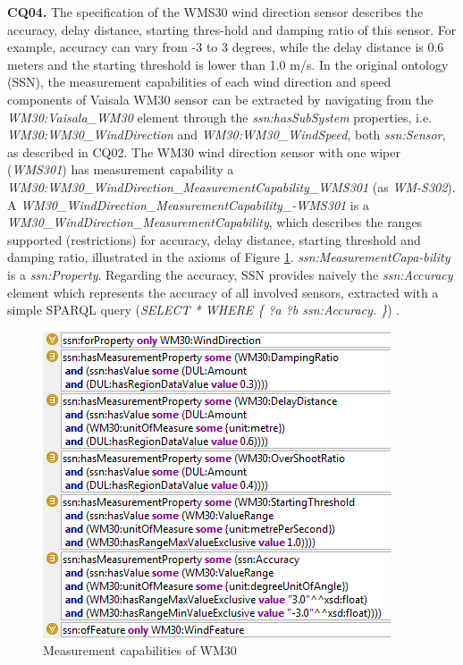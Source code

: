 \documentclass{sig-alternate-05-2015}
\begin{document}
\noindent
\textbf{CQ04.} The specification of the WMS30 wind direction sensor describes the accuracy, delay distance, starting thres-hold and damping ratio of this sensor. For example, accuracy can vary from -3 to 3 degrees, while the delay distance is 0.6 meters and the starting threshold is lower than 1.0 m/s.  
In the original ontology (SSN), the measurement capabilities of each wind direction and speed components  of Vaisala WM30 sensor can be extracted by navigating from the \textit{WM30:\-Vaisala\-\_WM30} element through the \textit{ssn:\-hasSubSystem} properties, i.e. \textit{WM30:\-WM30\-\_Wind\-Direction} and \textit{WM30:\-WM30\-\_WindSpeed}, both \textit{ssn:\-Sensor}, as described in CQ02. The WM30 wind direction sensor with one wiper (\textit{WMS301}) has measurement capability a  \textit{WM30:\-WM30\-\_Wind\-Direction\-\_MeasurementCapability\-\_WMS301} (as \textit{WM-S302}). A \textit{\-WM30\-\_Wind\-Direction\-\_MeasurementCapability\-\_-WMS301} is a \textit{\-WM30\-\_Wind\-Direction\-\_MeasurementCapability}, which describes the ranges supported (restrictions) for accuracy, delay distance, starting threshold and damping ratio, illustrated in the axioms of Figure \ref{fig:SSN_MeasurementCapability}. \textit{ssn:\-MeasurementCapa-bility} is a \textit{ssn:\-Property}.
Regarding the accuracy, SSN provides naively the \textit{ssn:\-Accuracy} element which represents the accuracy of all involved sensors, extracted with a simple SPARQL query (\textit{SELECT * WHERE \{ ?a ?b ssn:\-Accuracy. \}}) .  
\begin{figure}[h!]
\centering
\includegraphics[scale=0.81]{SSN_MeasurementCapability}
\caption{Measurement capabilities of WM30} 
\label{fig:SSN_MeasurementCapability}
\end{figure}
\end{document}
